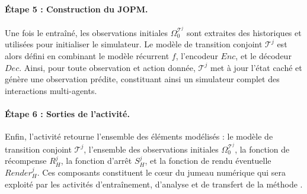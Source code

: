 \paragraph{Étape 5 : Construction du JOPM.}
Une fois le  entraîné, les observations initiales $\Omega^{\mathcal{T}^j}_0$ sont extraites des historiques et utilisées pour initialiser le simulateur.
Le modèle de transition conjoint $\mathcal{T}^j$ est alors défini en combinant le modèle récurrent $f$, l’encodeur $Enc$, et le décodeur $Dec$.
Ainsi, pour toute observation et action donnée, $\mathcal{T}^j$ met à jour l’état caché et génère une observation prédite, constituant ainsi un simulateur complet des interactions multi-agents.

\paragraph{Étape 6 : Sorties de l’activité.}
Enfin, l’activité retourne l’ensemble des éléments modélisés : le modèle de transition conjoint $\mathcal{T}^j$, l’ensemble des observations initiales $\Omega^{\mathcal{T}^j}_0$, la fonction de récompense $R^j_H$, la fonction d’arrêt $S^j_H$, et la fonction de rendu éventuelle $Render^j_H$.
Ces composants constituent le cœur du jumeau numérique qui sera exploité par les activités d’entraînement, d’analyse et de transfert de la méthode .


